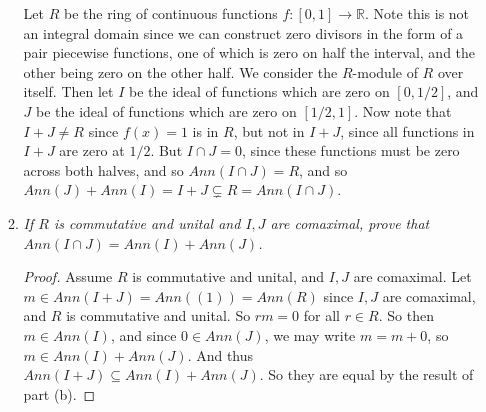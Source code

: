 \documentclass[10pt,oneside,reqno]{amsart}
\theoremstyle{plain}
\newcommand{\sub}{\subseteq}
\newcommand{\R}{\mathbb{R}}
\theoremstyle{definition}
\theoremstyle{remark}
\begin{document}
\begin{enumerate}[label=\arabic*.]
\begin{enumerate}
 Let $R$ be the ring of continuous functions $f:[0,1] \to \R$. Note this is not an integral domain since we can construct zero divisors in the form of a pair piecewise functions, one of which is zero on half the interval, and the other being zero on the other half. We consider the $R$-module of $R$ over itself. Then let $I$ be the ideal of functions which are zero on $[0,1/2]$, and $J$ be the ideal of functions which are zero on $[1/2,1]$. Now note that $I + J \neq R$ since $f(x) = 1$ is in $R$, but not in $I + J$, since all functions in $I + J$ are zero at $1/2$. But $I \cap J = 0$, since these functions must be zero across both halves, and so $Ann(I \cap J) = R$, and so $Ann(J) + Ann(I) = I + J \subsetneq R = Ann(I \cap J)$. 
 
 \item \textit{If $R$ is commutative and unital and $I,J$ are comaximal, prove that $Ann(I \cap J) = Ann(I) + Ann(J)$. }
 
 \begin{proof}
 Assume $R$ is commutative and unital, and $I,J$ are comaximal. 
 Let $m \in Ann(I + J) = Ann((1)) = Ann(R)$ since $I,J$ are comaximal, and $R$ is commutative and unital. So $rm = 0$ for all $r \in R$. So then $m \in Ann(I)$, and since $0 \in Ann(J)$, we may write $m = m + 0$, so $m \in Ann(I) + Ann(J)$. And thus $Ann(I + J) \sub Ann(I) + Ann(J)$. So they are equal by the result of part (b). 
 \end{proof}
 
 \end{enumerate}

\end{enumerate}
\end{document}
